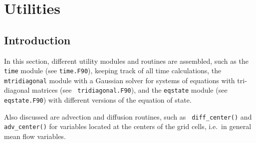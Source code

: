 %
%

\section{Utilities}\label{sec:util}

\subsection{Introduction}

In this section, different utility modules and routines are assembled,
such as the {\tt time} module (see {\tt time.F90}), keeping track of all time
calculations, the {\tt mtridiagonal} module with a Gaussian solver for
systems of equations with tri-diagonal matrices (see {\tt
tridiagonal.F90}), and the {\tt eqstate} module (see {\tt
eqstate.F90}) with different versions of the equation of state.

Also discussed are advection and diffusion routines, such as {\tt
diff\_center()} and {\tt adv\_center()} for variables located
at the centers of the grid cells, i.e.\ in general mean flow
variables. 



